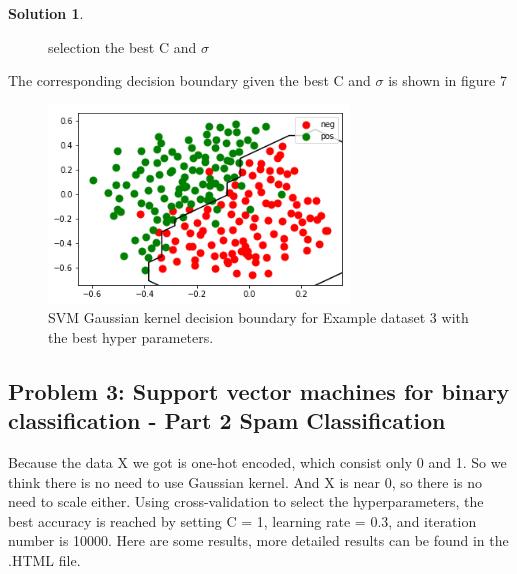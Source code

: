 \documentclass[]{book}
\theoremstyle{definition}
\newtheorem*{soln}{Solution}
\begin{document}
\begin{enumerate}
\begin{soln}
\begin{figure}[H]
			\caption{selection the best C and $\sigma$ }
			\label{fig:6}
		\end{figure}
		The corresponding decision boundary given the best C and $\sigma$ is shown in figure 7
		\begin{figure}[H]
			\centering
			\includegraphics[width=8cm]{seHyperparameters.png}
			\caption{SVM Gaussian kernel decision boundary for Example dataset 3 with the best hyper parameters.}
			\label{fig:7}
		\end{figure}
	\end{soln}
\end{enumerate}
\subsection*{Problem 3: Support vector machines for binary classification - Part 2 Spam Classification }

Because the data X we got is one-hot encoded, which consist only 0 and 1. So we think there is no need to use Gaussian kernel. And X is near 0, so there is no need to scale either. Using cross-validation to select the hyperparameters, the best accuracy is reached by setting C = 1, learning rate = 0.3, and iteration number is 10000.
Here are some results, more detailed results can be found in the .HTML file.
\end{document}
